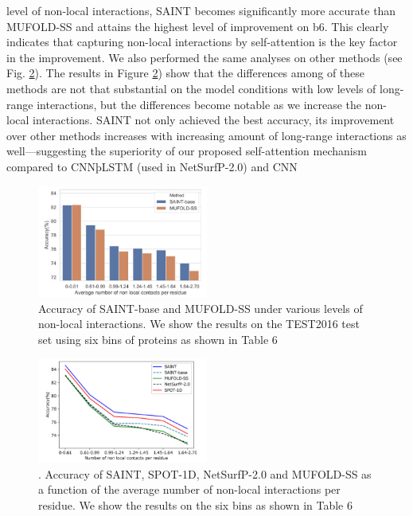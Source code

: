 \documentclass[8pt]{article}
\begin{document}
\begin{multicols}{2}
level of non-local interactions, SAINT becomes significantly more
accurate than MUFOLD-SS and attains the highest level of improvement on b6. This clearly indicates that capturing non-local interactions by self-attention is the key factor in the improvement. We also
performed the same analyses on other methods (see Fig.  \ref{fig:img3}). The
results in Figure \ref{fig:img3}) show that the differences among of these methods
are not that substantial on the model conditions with low levels of
long-range interactions, but the differences become notable as we increase the non-local interactions. SAINT not only achieved the best
accuracy, its improvement over other methods increases with
increasing amount of long-range interactions as well—suggesting
the superiority of our proposed self-attention mechanism compared
to CNNþLSTM (used in NetSurfP-2.0) and CNN







\begin{figure}[H]
         \centering\includegraphics[width=0.5\textwidth]{img2.png}
        
         \caption{Accuracy of SAINT-base and MUFOLD-SS under various levels of non-local
interactions. We show the results on the TEST2016 test set using six bins of proteins as shown in Table 6}
\label{fig:img2}
\end{figure}
\begin{figure}[H]
         \centering
         \includegraphics[width=0.5\textwidth]{img3.png}
         \caption{. Accuracy of SAINT, SPOT-1D, NetSurfP-2.0 and MUFOLD-SS as a function
of the average number of non-local interactions per residue. We show the results on
the six bins as shown in Table 6}
\label{fig:img3}
\end{figure}



\end{multicols}
\end{document}
